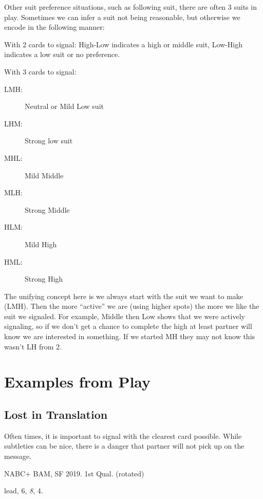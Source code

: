 \documentclass[tom-ari]{subfiles}
\begin{document}
Other suit preference situations, such as following suit, there are often 3 suits in play. Sometimes we can infer a suit not being reasonable, but otherwise we encode in the following manner:

With 2 cards to signal: High-Low indicates a high or middle suit, Low-High indicates a low suit or no preference.

With 3 cards to signal:

\begin{description}
	\item [LMH:] Neutral or Mild Low suit
	\item [LHM:] Strong low suit
	\item [MHL:] Mild Middle
	\item [MLH:] Strong Middle
	\item [HLM:] Mild High
	\item [HML:] Strong High
\end{description}

The unifying concept here is we always start with the suit we want to make (LMH). Then the more ``active'' we are (using higher spots) the more we like the suit we signaled.  For example, Middle then Low shows that we were actively signaling, so if we don't get a chance to complete the high at least partner will know we are interested in something. If we started MH they may not know this wasn't LH from 2.

\chapter{Examples from Play}

\section{Lost in Translation}

Often times, it is important to signal with the clearest card possible. While subtleties can be nice, there is a danger that partner will not pick up on the message. 

NABC+ BAM, SF 2019. 1st Qual. (rotated)

\begin{handdiagram}
\end{handdiagram}	 	


 lead, 6, \textit{8}, 4.
\end{document}
